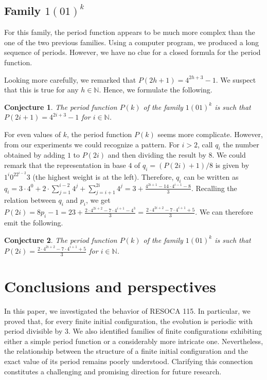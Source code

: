 \documentclass[submission,copyright,creativecommons]{eptcs}
\newcommand{\N}{\ensuremath{\mathbb{N}}\xspace}
\newtheorem{conjecture}{Conjecture}
\begin{document}
\subsection{Family $1(01)^k$}
%
For this family, the period function appears to
be much more complex than the one of the two previous families.
Using a computer program, we produced a long sequence of
periods.
However, we have no clue for a closed
formula for the period function.

Looking more carefully, %
we remarked
that $P(2h+1)=4^{2h+3}-1$. We suspect
that this is true for any $h\in\N$. Hence, we formulate the following.
 
\begin{conjecture}
    \label{conjecture:base4power4}
    The period function $P(k)$ of
    the family $1(01)^k$ is such
    that $P(2i+1)=4^{2i+3}-1$
    for $i\in\N$.
\end{conjecture}

For even values of $k$, the period function $P(k)$ seems more complicate.
However, from our experiments we could
recognize a pattern.
For $i>2$, call $q_i$ the number obtained by adding $1$ to $P(2i)$ and then dividing the result by $8$.
We could remark that the representation in base $4$ of $q_i=(P(2i)+1)/8$ is given by
$1^i0^22^{i-2}3$ (the highest weight is at the left). Therefore, $q_i$
can be written as $q_i=3\cdot 4^0+2\cdot\sum_{j=1}^{i-2}4^j+\sum_{j=i+1}^{2i}4^j=3+\frac{4^{2i+1}-14\cdot4^{i-1}-8}{3}$. Recalling the relation between $q_i$ and $p_i$,
we get $P(2i)=8p_i-1=23+\frac{2\cdot4^{2i+2}-7\cdot4^{i+1}-4^3}{3}=\frac{2\cdot4^{2i+2}-7\cdot4^{i+1}+5}{3}$. We can therefore emit the
following.

\begin{conjecture}
    \label{conjecture:base4power4even}
    The period function $P(k)$ of
    the family $1(01)^k$ is such
    that $P(2i)=\frac{2\cdot4^{2i+2}-7\cdot4^{i+1}+5}{3}$
    for $i\in\N$.
\end{conjecture}
%
\section{Conclusions and perspectives}
%
In this paper, we investigated the behavior of RESOCA 115. In particular, we proved that, for every finite initial configuration, the evolution is periodic with period divisible by 3. We also identified families of finite configurations exhibiting either a simple period function or a considerably more intricate one. Nevertheless, the relationship between the structure of a finite initial configuration and the exact value of its period remains poorly understood. Clarifying this connection constitutes a challenging and promising direction for future research.
\end{document}
